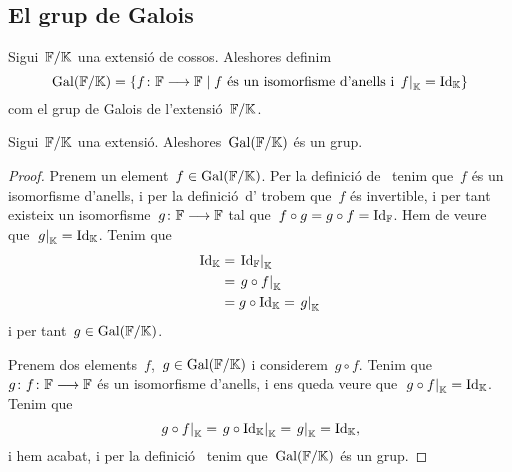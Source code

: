 \documentclass[../Apunts.tex]{subfiles}
\begin{document}
\subsection{El grup de Galois}
	\begin{definition}
		\label{def:grup de Galois}
		Sigui~\(\mathbb{F}/\mathbb{K}\) una extensió de cossos. Aleshores definim
		\[\Gal(\FF\extensio\KK)=\{f\colon\FF\longrightarrow\FF\mid f\text{ és un isomorfisme d'anells i }\left.f\right|_{\KK}=\Id_{\KK}\}\]
		com el grup de Galois de l'extensió~\(\mathbb{F}/\mathbb{K}\).
	\end{definition}
	\begin{proposition}
		\label{prop:el grup de Galois és un grup}
		Sigui~\(\mathbb{F}/\mathbb{K}\) una extensió. Aleshores~\(\operatorname{Gal}(\mathbb{F}/\mathbb{K})\) és un grup.
		\begin{proof} %
			Prenem un element~\(f\in\operatorname{Gal}(\mathbb{F}/\mathbb{K})\). Per la definició de~ tenim que~\(f\) és un isomorfisme d'anells, i per la definició~d' trobem que~\(f\) és invertible, i per tant existeix un isomorfisme~\(g\colon\mathbb{F}\longrightarrow\mathbb{F}\) tal que~\(f\circ g=g\circ f=\operatorname{Id}_{\mathbb{F}}\). Hem de veure que~\(\left.g\right|_{\KK}=\Id_{\KK}\). Tenim que
			\begin{align*}
				\Id_{\KK}&=\left.\Id_{\FF}\right|_{\KK} \\
				&=\left.g\circ f\right|_{\KK} \\
				&=g\circ\Id_{\KK}=\left.g\right|_{\KK}
			\end{align*}
			i per tant~\(g\in\operatorname{Gal}(\mathbb{F}/\mathbb{K})\).
			
			Prenem dos elements~\(f\),~\(g\in\operatorname{Gal}(\mathbb{F}/\mathbb{K})\) i considerem~\(g\circ f\). Tenim que~\(g\colon f\colon\mathbb{F}\longrightarrow\mathbb{F}\) és un isomorfisme d'anells, i ens queda veure que~\(\left.g\circ f\right|_{\KK}=\Id_{\KK}\). Tenim que
			\[\left.g\circ f\right|_{\KK}
			=\left.g\circ\Id_{\KK}\right|_{\KK}
			=\left.g\right|_{\KK}
			=\Id_{\KK},\]
			i hem acabat, i per la definició~ tenim que~\(\operatorname{Gal}(\mathbb{F}/\mathbb{K})\) és un grup.
		\end{proof}
	\end{proposition}
\end{document}
